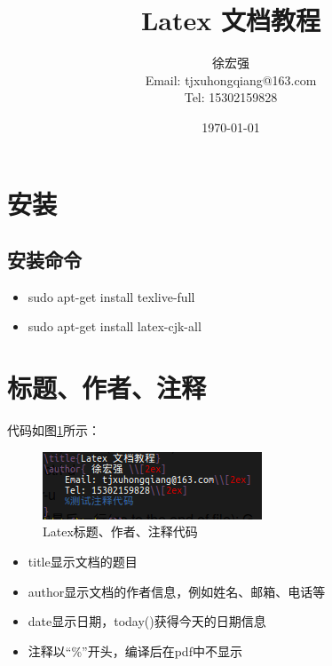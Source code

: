 \documentclass[a4paper,  11pt]{article}
\begin{document}
\title{Latex 文档教程}
\author{ 徐宏强 \\[2ex]
	Email: tjxuhongqiang@163.com\\[2ex]
	Tel: 15302159828\\[2ex]
}
\date{\today{}}

\maketitle

\tableofcontents

\newpage 

\section{安装}
\subsection{安装命令}

\begin{itemize}
  \item sudo apt-get install texlive-full\\
  \item sudo apt-get install latex-cjk-all
\end{itemize}

\section{标题、作者、注释}

代码如图\ref{fig:user}所示：

\begin{figure}[h!]
\centering
\includegraphics[scale=.7]{author_2.png}
\caption{Latex标题、作者、注释代码}
\label{fig:user}
\end{figure}

\begin{itemize}
  \item title显示文档的题目
  \item author显示文档的作者信息，例如姓名、邮箱、电话等
  \item date显示日期，today()获得今天的日期信息
  \item 注释以“\%”开头，编译后在pdf中不显示
\end{itemize}
\end{document}
